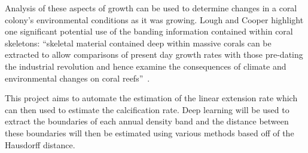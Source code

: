 Analysis of these aspects of growth can be used to determine changes in a coral colony's environmental conditions as it was growing. Lough and Cooper highlight one significant potential use of the banding information contained within coral skeletons: ``skeletal material contained deep within massive corals can be extracted to allow comparisons of present day growth rates with those pre-dating the industrial revolution and hence examine the consequences of climate and environmental changes on coral reefs''~\cite{lough2011new}.

This project aims to automate the estimation of the linear extension rate which can then used to estimate the calcification rate. Deep learning will be used to extract the boundaries of each annual density band and the distance between these boundaries will then be estimated using various methods based off of the Hausdorff distance.

